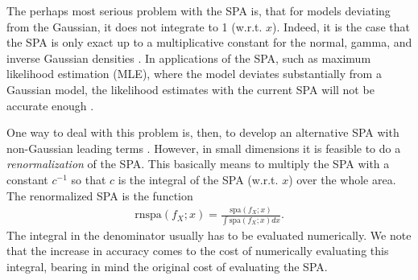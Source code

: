 The perhaps most serious problem with the SPA is, that for models deviating from the Gaussian, it does not integrate to 1 (w.r.t. $x$).
Indeed, it is the case that the SPA is  only exact up to a multiplicative constant for the normal, gamma, and inverse Gaussian densities \citep{kolassa2006series}. In applications of the SPA, such as maximum likelihood estimation (MLE), where the model deviates substantially from a Gaussian model, the likelihood estimates with the current SPA will not be accurate enough \citep{kleppe2008building}.

One way to deal with this problem is, then, to develop an alternative SPA with non-Gaussian leading terms \citep{kleppe2008building, ai2006saddlepoint}. 
However, in small dimensions it is feasible to do a \textit{renormalization} of the SPA. 
This basically means to multiply the SPA with a constant $c^{-1}$ so that $c$ is the integral of the SPA (w.r.t. $x$) over the whole area. 
The renormalized SPA is the function 
\begin{align}\label{Chap3.2 renormalization equation}
\text{rnspa}\left(f_{X};x\right)=\frac{\text{spa}\left(f_{X};x\right)}{\int \text{spa}\left(f_{X};x\right) dx}.
\end{align}
The integral in the denominator usually has to be evaluated numerically. We note that the increase in accuracy comes to the cost of numerically evaluating this integral, bearing in mind the original cost of evaluating the SPA.

